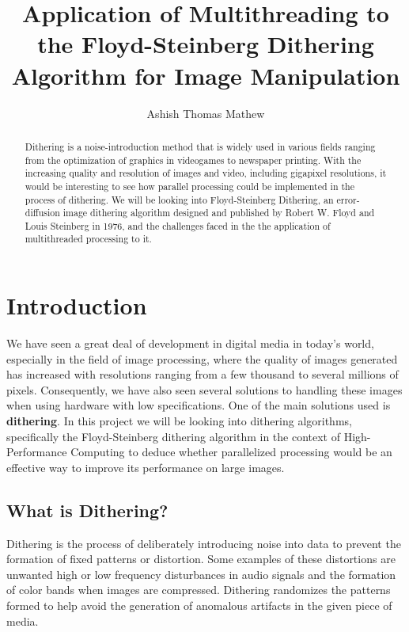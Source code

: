 \documentclass{article}
\title{Application of Multithreading to the Floyd-Steinberg Dithering Algorithm for Image Manipulation}
\author{Ashish Thomas Mathew}
\date{}
\begin{document}
\maketitle
\begin{abstract}
    \noindent Dithering is a noise-introduction method that is widely used in various fields ranging from the optimization of graphics in videogames to newspaper printing. With the increasing quality and resolution of images and video, including gigapixel resolutions, it would be interesting to see how parallel processing could be implemented in the process of dithering. We will be looking into Floyd-Steinberg Dithering, an error-diffusion image dithering algorithm designed and published by Robert W. Floyd and Louis Steinberg in 1976, and the challenges faced in the the application of multithreaded processing to it.  
\end{abstract}

\section{Introduction}\label{Introduction}

We have seen a great deal of development in digital media in today's world, especially in the field of image processing, where the quality of images generated has increased with resolutions ranging from a few thousand to several millions of pixels. Consequently, we have also seen several solutions to handling these images when using hardware with low specifications. One of the main solutions used is \textbf{dithering}. In this project we will be looking into dithering algorithms, specifically the Floyd-Steinberg dithering algorithm\cite{Steinberg} in the context of High-Performance Computing to deduce whether parallelized processing would be an effective way to improve its performance on large images.

\subsection{What is Dithering?}\label{Dithering Intro}

Dithering is the process of deliberately introducing noise into data to prevent the formation of fixed patterns or distortion. Some examples of these distortions are unwanted high or low frequency disturbances in audio signals and the formation of color bands when images are compressed. Dithering randomizes the patterns formed to help avoid the generation of anomalous artifacts in the given piece of media.
\end{document}

